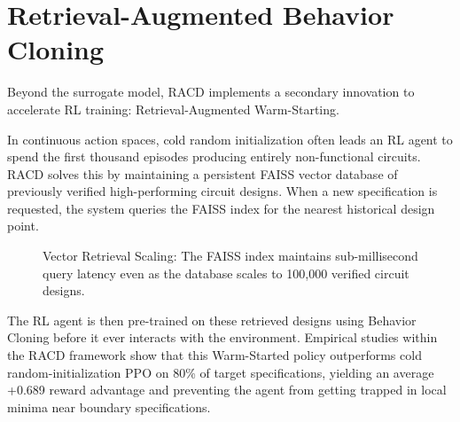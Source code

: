 \documentclass[11pt, a4paper]{article}
\begin{document}
\section{Retrieval-Augmented Behavior Cloning}
Beyond the surrogate model, RACD implements a secondary innovation to accelerate RL training: Retrieval-Augmented Warm-Starting. 

In continuous action spaces, cold random initialization often leads an RL agent to spend the first thousand episodes producing entirely non-functional circuits. RACD solves this by maintaining a persistent FAISS vector database of previously verified high-performing circuit designs. When a new specification is requested, the system queries the FAISS index for the nearest historical design point.

\begin{figure}[!htbp]
    \centering
    \caption{Vector Retrieval Scaling: The FAISS index maintains sub-millisecond query latency even as the database scales to 100,000 verified circuit designs.}
\end{figure}

The RL agent is then pre-trained on these retrieved designs using Behavior Cloning before it ever interacts with the environment. Empirical studies within the RACD framework show that this Warm-Started policy outperforms cold random-initialization PPO on 80\% of target specifications, yielding an average +0.689 reward advantage and preventing the agent from getting trapped in local minima near boundary specifications.
\end{document}
